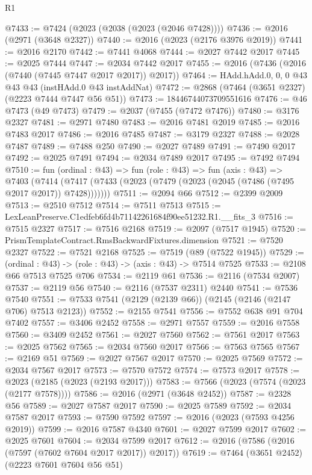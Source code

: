 \begin{lexlean}{R1}
\begin{coremodule}
@7433 := @7424 (@2023 (@2038 (@2023 (@2046 @7428))))
@7436 := @2016 (@2971 (@3648 @2327))
@7440 := @2016 (@2023 (@2176 @3976 @2019))
@7441 := @2016 @2170
@7442 := @7441 @4068
@7444 := @2027 @7442 @2017
@7445 := @2025 @7444
@7447 := @2034 @7442 @2017
@7455 := @2016 (@7436 (@2016 (@7440 (@7445 @7447 @2017 @2017)) @2017))
@7464 := HAdd.hAdd.{0, 0, 0} @43 @43 @43 (instHAdd.{0} @43 instAddNat)
@7472 := @2868 (@7464 (@3651 @2327) (@2223 @7444 @7447 @56 @51))
@7473 := 18446744073709551616
@7476 := @46 @7473 (@49 @7473)
@7479 := @2037 (@7455 (@7472 @7476))
@7480 := @3176 @2327
@7481 := @2971 @7480
@7483 := @2016 @7481 @2019
@7485 := @2016 @7483 @2017
@7486 := @2016 @7485
@7487 := @3179 @2327
@7488 := @2028 @7487
@7489 := @7488 @250
@7490 := @2027 @7489
@7491 := @7490 @2017
@7492 := @2025 @7491
@7494 := @2034 @7489 @2017
@7495 := @7492 @7494
@7510 := fun (ordinal : @43) =>
  fun (role : @43) =>
  fun (axis : @43) =>
  @7403 (@7414 (@7417 (@7433 (@2023 (@7479 (@2023 (@2045 (@7486 (@7495 @2017 @2017)) @7428)))))))
@7511 := @2094 @66
@7512 := @2399 @2009
@7513 := @2510 @7512
@7514 := @7511 @7513
@7515 := LexLeanPreserve.C1edfeb6fd4b71142261684f90ee51232.R1.__fits_3
@7516 := @7515 @2327
@7517 := @7516 @2168
@7519 := @2097 (@7517 @1945)
@7520 := PrismTemplateContract.RmsBackwardFixtures.dimension
@7521 := @7520 @2327
@7522 := @7521 @2168
@7525 := @7519 (@89 (@7522 @1945))
@7529 := (ordinal : @43) -> (role : @43) -> (axis : @43) -> @7514 @7525
@7533 := @2108 @66 @7513 @7525 @706
@7534 := @2119 @61
@7536 := @2116 (@7534 @2007)
@7537 := @2119 @56
@7540 := @2116 (@7537 @2311) @2440
@7541 := @7536 @7540
@7551 := @7533 @7541 (@2129 (@2139 @66)) (@2145 (@2146 (@2147 @706) @7513 @2123))
@7552 := @2155 @7541
@7556 := @7552 @638 @91 @704 @7402
@7557 := @3406 @2452
@7558 := @2971 @7557
@7559 := @2016 @7558
@7560 := @3409 @2452
@7561 := @2027 @7560
@7562 := @7561 @2017
@7563 := @2025 @7562
@7565 := @2034 @7560 @2017
@7566 := @7563 @7565
@7567 := @2169 @51
@7569 := @2027 @7567 @2017
@7570 := @2025 @7569
@7572 := @2034 @7567 @2017
@7573 := @7570 @7572
@7574 := @7573 @2017
@7578 := @2023 (@2185 (@2023 (@2193 @2017)))
@7583 := @7566 (@2023 (@7574 (@2023 (@2177 @7578))))
@7586 := @2016 (@2971 (@3648 @2452))
@7587 := @2328 @56
@7589 := @2027 @7587 @2017
@7590 := @2025 @7589
@7592 := @2034 @7587 @2017
@7593 := @7590 @7592
@7597 := @2016 (@2023 (@7593 @4256 @2019))
@7599 := @2016 @7587 @4340
@7601 := @2027 @7599 @2017
@7602 := @2025 @7601
@7604 := @2034 @7599 @2017
@7612 := @2016 (@7586 (@2016 (@7597 (@7602 @7604 @2017 @2017)) @2017))
@7619 := @7464 (@3651 @2452) (@2223 @7601 @7604 @56 @51)

\end{coremodule}
\end{lexlean}
